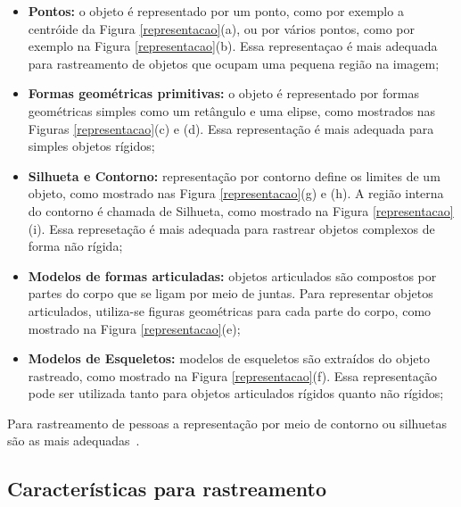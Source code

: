 	\begin{itemize}
		\item \textbf{Pontos:} o objeto é representado por um ponto, como por exemplo a centróide da Figura \ref{representacao}(a), ou por vários pontos, como por exemplo na Figura \ref{representacao}(b). Essa representaçao é mais adequada para rastreamento de objetos que ocupam uma pequena região na imagem;
		\item \textbf{Formas geométricas primitivas:} o objeto é representado por formas geométricas simples como um retângulo e uma elipse, como mostrados nas Figuras \ref{representacao}(c) e (d). Essa representação é mais adequada para simples objetos rígidos;
		\item \textbf{Silhueta e Contorno:} representação por contorno define os limites de um objeto, como mostrado nas Figura \ref{representacao}(g) e (h). A região interna do contorno é chamada de Silhueta, como mostrado na Figura \ref{representacao}(i). Essa represetação é mais adequada para rastrear objetos complexos de forma não rígida;
		\item \textbf{Modelos de formas articuladas:} objetos articulados são compostos por partes do corpo que se ligam por meio de juntas. Para representar objetos articulados, utiliza-se figuras geométricas para cada parte do corpo, como mostrado na Figura \ref{representacao}(e);
		\item \textbf{Modelos de Esqueletos:} modelos de esqueletos são extraídos do objeto rastreado, como mostrado na Figura \ref{representacao}(f). Essa representação pode ser utilizada tanto para objetos articulados rígidos quanto não rígidos;
	\end{itemize}

	Para rastreamento de pessoas a representação por meio de contorno ou silhuetas são as mais adequadas~\cite{yilmaz}.


\subsection{Características para rastreamento}

